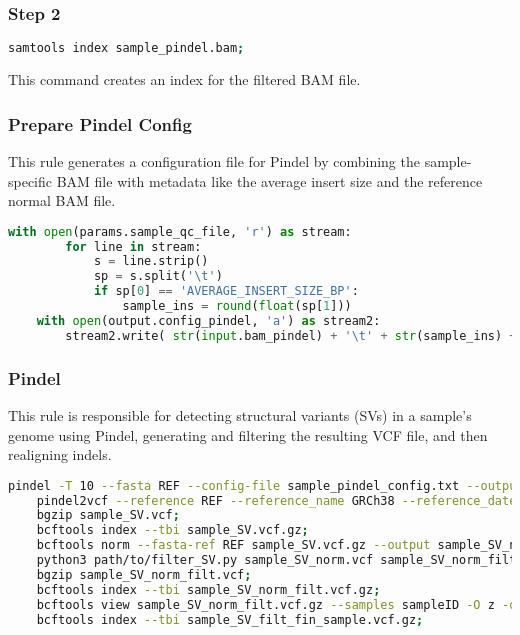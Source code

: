\subsubsection*{Step 2}

\begin{lstlisting}[breaklines=true, language=bash]
    samtools index sample_pindel.bam;
\end{lstlisting}

This command creates an index for the filtered BAM file.

\subsubsection{Prepare Pindel Config}

This rule generates a configuration file for Pindel by combining the sample-specific BAM file with metadata like the average insert size and the reference normal BAM file.

\begin{lstlisting}[breaklines=true, language=python]
    with open(params.sample_qc_file, 'r') as stream:
        for line in stream:
            s = line.strip()
            sp = s.split('\t')
            if sp[0] == 'AVERAGE_INSERT_SIZE_BP':
                sample_ins = round(float(sp[1]))
    with open(output.config_pindel, 'a') as stream2:
        stream2.write( str(input.bam_pindel) + '\t' + str(sample_ins) + '\t' + str(params.sampleID) + '\n' + str(params.normal_bam) + '\t150\tNormal')	
\end{lstlisting}

\subsubsection{Pindel}

This rule is responsible for detecting structural variants (SVs) in a sample's genome using Pindel, generating and filtering the resulting VCF file, and then realigning indels. 

\begin{lstlisting}[breaklines=true, language=bash]
    pindel -T 10 --fasta REF --config-file sample_pindel_config.txt --output-prefix sample_SV --anchor_quality 10 --include path/to/CORE_covered_regions.bed --minimum_support_for_event 20 --name_of_logfile log_dir/011-SVCalling_rule_sample.log;
    pindel2vcf --reference REF --reference_name GRCh38 --reference_date 20160222 --pindel_output_root sample_SV;
    bgzip sample_SV.vcf;
    bcftools index --tbi sample_SV.vcf.gz;
    bcftools norm --fasta-ref REF sample_SV.vcf.gz --output sample_SV_norm.vcf;
    python3 path/to/filter_SV.py sample_SV_norm.vcf sample_SV_norm_filt.vcf;
    bgzip sample_SV_norm_filt.vcf;
    bcftools index --tbi sample_SV_norm_filt.vcf.gz;
    bcftools view sample_SV_norm_filt.vcf.gz --samples sampleID -O z -o sample_SV_filt_fin_sample.vcf.gz;
    bcftools index --tbi sample_SV_filt_fin_sample.vcf.gz;
\end{lstlisting}


